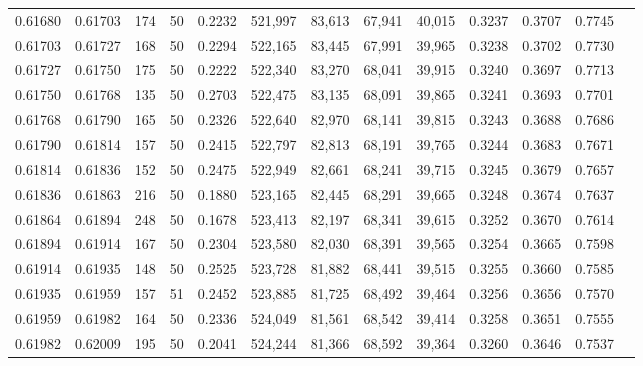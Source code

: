 \begin{tabular}{rrrrrrrrrrrrr}
0.61680 & 0.61703 &   174 &  50 &                                     0.2232 & 521,997 &  83,613 &  67,941 &  40,015 & 0.3237 & 0.3707 & 0.7745 \\
0.61703 & 0.61727 &   168 &  50 &                                     0.2294 & 522,165 &  83,445 &  67,991 &  39,965 & 0.3238 & 0.3702 & 0.7730 \\
0.61727 & 0.61750 &   175 &  50 &                                     0.2222 & 522,340 &  83,270 &  68,041 &  39,915 & 0.3240 & 0.3697 & 0.7713 \\
0.61750 & 0.61768 &   135 &  50 &                                     0.2703 & 522,475 &  83,135 &  68,091 &  39,865 & 0.3241 & 0.3693 & 0.7701 \\
0.61768 & 0.61790 &   165 &  50 &                                     0.2326 & 522,640 &  82,970 &  68,141 &  39,815 & 0.3243 & 0.3688 & 0.7686 \\
0.61790 & 0.61814 &   157 &  50 &                                     0.2415 & 522,797 &  82,813 &  68,191 &  39,765 & 0.3244 & 0.3683 & 0.7671 \\
0.61814 & 0.61836 &   152 &  50 &                                     0.2475 & 522,949 &  82,661 &  68,241 &  39,715 & 0.3245 & 0.3679 & 0.7657 \\
0.61836 & 0.61863 &   216 &  50 &                                     0.1880 & 523,165 &  82,445 &  68,291 &  39,665 & 0.3248 & 0.3674 & 0.7637 \\
0.61864 & 0.61894 &   248 &  50 &                                     0.1678 & 523,413 &  82,197 &  68,341 &  39,615 & 0.3252 & 0.3670 & 0.7614 \\
0.61894 & 0.61914 &   167 &  50 &                                     0.2304 & 523,580 &  82,030 &  68,391 &  39,565 & 0.3254 & 0.3665 & 0.7598 \\
0.61914 & 0.61935 &   148 &  50 &                                     0.2525 & 523,728 &  81,882 &  68,441 &  39,515 & 0.3255 & 0.3660 & 0.7585 \\
0.61935 & 0.61959 &   157 &  51 &                                     0.2452 & 523,885 &  81,725 &  68,492 &  39,464 & 0.3256 & 0.3656 & 0.7570 \\
0.61959 & 0.61982 &   164 &  50 &                                     0.2336 & 524,049 &  81,561 &  68,542 &  39,414 & 0.3258 & 0.3651 & 0.7555 \\
0.61982 & 0.62009 &   195 &  50 &                                     0.2041 & 524,244 &  81,366 &  68,592 &  39,364 & 0.3260 & 0.3646 & 0.7537 \\

\end{tabular}
